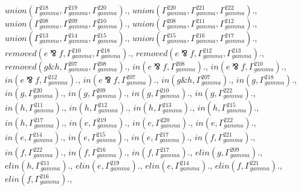 \documentclass[a4paper, 11pt]{article}
\begin{document}
$union(\Gamma_{gamma}^{218}, \Gamma_{gamma}^{219}, \Gamma_{gamma}^{220}).$, $union(\Gamma_{gamma}^{220}, \Gamma_{gamma}^{221}, \Gamma_{gamma}^{222}).$, $union(\Gamma_{gamma}^{208}, \Gamma_{gamma}^{209}, \Gamma_{gamma}^{210}).$, $union(\Gamma_{gamma}^{208}, \Gamma_{gamma}^{211}, \Gamma_{gamma}^{212}).$, $union(\Gamma_{gamma}^{213}, \Gamma_{gamma}^{214}, \Gamma_{gamma}^{215}).$, $union(\Gamma_{gamma}^{215}, \Gamma_{gamma}^{216}, \Gamma_{gamma}^{217}).$, $removed(e \bindnasrepma f, \Gamma_{gamma}^{210}, \Gamma_{gamma}^{218}).$, $removed(e \bindnasrepma f, \Gamma_{gamma}^{212}, \Gamma_{gamma}^{213}).$, $removed(g \binampersand h, \Gamma_{gamma}^{207}, \Gamma_{gamma}^{208}).$, $in(e \bindnasrepma f, \Gamma_{gamma}^{208}).$, $in(e \bindnasrepma f, \Gamma_{gamma}^{210}).$, $in(e \bindnasrepma f, \Gamma_{gamma}^{212}).$, $in(e \bindnasrepma f, \Gamma_{gamma}^{207}).$, $in(g \binampersand h, \Gamma_{gamma}^{207}).$, $in(g, \Gamma_{gamma}^{218}).$, $in(g, \Gamma_{gamma}^{220}).$, $in(g, \Gamma_{gamma}^{209}).$, $in(g, \Gamma_{gamma}^{210}).$, $in(g, \Gamma_{gamma}^{222}).$, $in(h, \Gamma_{gamma}^{211}).$, $in(h, \Gamma_{gamma}^{212}).$, $in(h, \Gamma_{gamma}^{213}).$, $in(h, \Gamma_{gamma}^{215}).$, $in(h, \Gamma_{gamma}^{217}).$, $in(e, \Gamma_{gamma}^{219}).$, $in(e, \Gamma_{gamma}^{220}).$, $in(e, \Gamma_{gamma}^{222}).$, $in(e, \Gamma_{gamma}^{214}).$, $in(e, \Gamma_{gamma}^{215}).$, $in(e, \Gamma_{gamma}^{217}).$, $in(f, \Gamma_{gamma}^{221}).$, $in(f, \Gamma_{gamma}^{222}).$, $in(f, \Gamma_{gamma}^{216}).$, $in(f, \Gamma_{gamma}^{217}).$, $elin(g, \Gamma_{gamma}^{209}).$, $elin(h, \Gamma_{gamma}^{211}).$, $elin(e, \Gamma_{gamma}^{219}).$, $elin(e, \Gamma_{gamma}^{214}).$, $elin(f, \Gamma_{gamma}^{221}).$, $elin(f, \Gamma_{gamma}^{216}).$,
\end{document}
